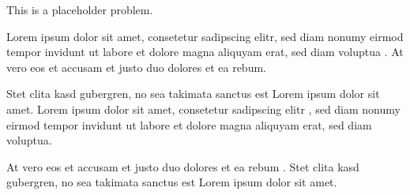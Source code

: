 This is a placeholder problem.
\begin{Problem}
\item Lorem ipsum dolor sit amet, consetetur sadipscing elitr, sed diam nonumy eirmod tempor invidunt ut labore et dolore magna aliquyam erat, sed diam voluptua . At vero eos et accusam et justo duo dolores et ea rebum. 
\item Stet clita kasd gubergren, no sea takimata sanctus est Lorem ipsum dolor sit amet. Lorem ipsum dolor sit amet, consetetur sadipscing elitr , sed diam nonumy eirmod tempor invidunt ut labore et dolore magna aliquyam erat, sed diam voluptua. 
\item At vero eos et accusam et justo duo dolores et ea rebum . Stet clita kasd gubergren, no sea takimata sanctus est Lorem ipsum dolor sit amet. 
\end{Problem}

